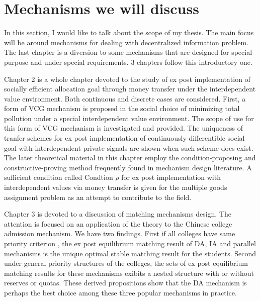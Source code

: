 \begin{comment}
In fact, the existence of the second mechanism is implied by the existence of the first mechanism by a simple application of revelation principle.If due to some reason for implementation, a revelation mechanism is more preferred, whenever we have chanced upon a mechanism implementing some social goal, we can convert it to a revelation mechanism which achieve the same social goal of the original mechanism.
\end{comment}






 

 

\section{Mechanisms we will discuss}

In this section, I would like to talk about the scope of my
thesis. The main focus will be around mechanisms for dealing with
decentralized information problem. The last chapter is a diversion to
some mechanisms that are designed for special purpose and under special requirements. 3 chapters follow this introductory one.

Chapter 2 is a whole chapter devoted to the study of ex post implementation of socially efficient allocation goal through money transfer under the interdependent value environment. Both continuous and discrete cases are considered. First, a form of VCG mechanism is proposed in the social choice of minimizing total pollution under a special interdependent value environment. The scope of use for this form of VCG mechanism is investigated and provided.  The uniqueness of tranfer schemes for ex post implementation of continuously differentible social goal with interdependent private signals are shown when such scheme does exist. The later theoretical material in this chapter employ the condition-proposing and constructive-proving method frequently found in mechanism design literature.  A sufficient condition called Condtion $\rho$ for ex post implementation with interdependent values via money transfer is given for the multiple goods assignment problem as an attempt to contribute to the field. 

Chapter 3 is devoted to a discussion of matching mechanisms design. The attention is focused on an application of the theory to the Chinese college admission mechanism. We have two findings. First if all colleges have same priority criterion , the ex post equilibrium matching result of DA, IA and parallel mechanisms is the unique optimal stable matching result for the students. Second under general priority structures of the colleges, the sets of ex post equilibrium matching results for these mechanisms exibits a nested structure with or without reserves or quotas. These derived propositions show that the DA mechanism is perhaps the best choice among these three popular mechanisms in practice.

